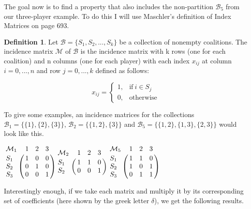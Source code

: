 \documentclass[10pt,a4paper,titlepage]{article}
\theoremstyle{plain}
\theoremstyle{definition}
\newtheorem{definition}[thm]{Definition} %
\begin{document}
The goal now is to find a property that also includes the non-partition $\mathcal{B}_5$ from our three-player example. To do this I will use Maschler's\cite{maschler} definition of Index Matrices on page 693.

\begin{definition}
    Let $\mathcal{B} = \{S_1, S_2, ..., S_k\}$ be a collection of nonempty coalitions. The incidence matrix $\mathcal{M}$ of $\mathcal{B}$ is the incidence matrix with k rows (one for each coalition) and n columns (one for each player) with each index $x_{ij}$ at column $i = {0, ..., n}$ and row $j = {0, ..., k}$ defined as follows:

    \begin{equation*}
        x_{ij} =
        \begin{cases}
            1, & \text{if}\ i \in S_j\\
            0, & \text{otherwise}
        \end{cases}
    \end{equation*}
\end{definition}

To give some examples, an incidence matrices for the collections $\mathcal{B}_1 = \{\{1\}, \{2\}, \{3\}\}$, $\mathcal{B}_2 = \{\{1, 2\}, \{3\}\}$ and $\mathcal{B}_5 = \{\{1, 2\}, \{1, 3\}, \{2, 3\}\}$ would look like this.\vspace{8pt}

$
\bordermatrix{
\mathcal{M}_1 & 1 & 2 & 3 \cr
S_1 & 1 & 0 & 0 \cr
S_2 & 0 & 1 & 0 \cr
S_3 & 0 & 0 & 1 \cr
}
$\hspace{50pt}$
\bordermatrix{
\mathcal{M}_2 & 1 & 2 & 3 \cr
S_1 & 1 & 1 & 0 \cr
S_2 & 0 & 0 & 1 \cr
}
$\hspace{50pt}$
\bordermatrix{
\mathcal{M}_5 & 1 & 2 & 3 \cr
S_1 & 1 & 1 & 0 \cr
S_2 & 1 & 0 & 1 \cr
S_3 & 0 & 1 & 1 \cr
}
$\vspace{8pt}

Interestingly enough, if we take each matrix and multiply it by its corresponding set of coefficients (here shown by the greek letter $\delta$), we get the following results.
\end{document}
